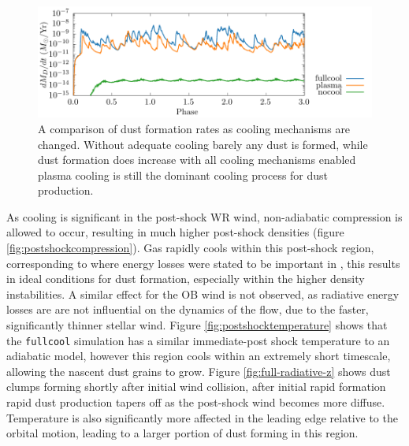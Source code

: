 \begin{figure}
  \centering
  \includegraphics{assets/cool-results/cool-phase-dust_rate.pdf}
  \caption[Comparison of dust formation rates with cooling methods]{A comparison of dust formation rates as cooling mechanisms are changed. Without adequate cooling barely any dust is formed, while dust formation does increase with all cooling mechanisms enabled plasma cooling is still the dominant cooling process for dust production.}
  \label{fig:coolingprocess-dustproduction}
\end{figure}



As cooling is significant in the post-shock WR wind, non-adiabatic compression is allowed to occur, resulting in much higher post-shock densities (figure \ref{fig:postshockcompression}).
Gas rapidly cools within this post-shock region, corresponding to where energy losses were stated to be important in \textcite{usov_stellar_1991}, this results in ideal conditions for dust formation, especially within the higher density instabilities.
A similar effect for the OB wind is not observed, as radiative energy losses are are not influential on the dynamics of the flow, due to the faster, significantly thinner stellar wind.
Figure \ref{fig:postshocktemperature} shows that the \texttt{fullcool} simulation has a similar immediate-post shock temperature to an adiabatic model, however this region cools within an extremely short timescale, allowing the nascent dust grains to grow.
Figure \ref{fig:full-radiative-z} shows dust clumps forming shortly after initial wind collision, 
after initial rapid formation rapid dust production tapers off as the post-shock wind becomes more diffuse. 
Temperature is also significantly more affected in the leading edge relative to the orbital motion, leading to a larger portion of dust forming in this region.

